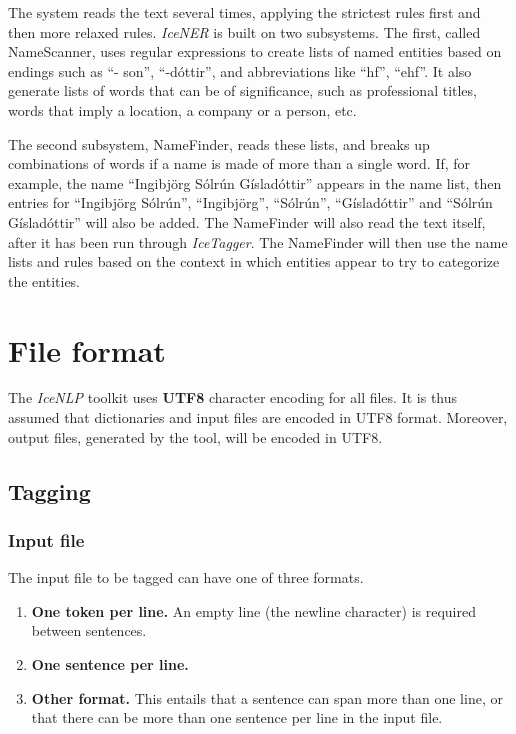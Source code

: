 \documentclass[11pt]{article}
\begin{document}
The system reads the text several times, applying the strictest rules first and then more relaxed rules.
\emph{IceNER} is built on two subsystems.
The first, called NameScanner, uses regular expressions to create lists of named entities based on endings such as ``-
son'', ``-dóttir'', and abbreviations like ``hf'', ``ehf''.
It also generate lists of words that can be of significance, such as professional titles, words that imply a location, a company or a person, etc.

The second subsystem, NameFinder, reads these lists, and breaks up combinations of words if a name is made of more than a single word. If, for example, the name ``Ingibjörg Sólrún Gísladóttir'' appears in the name list, then entries for ``Ingibjörg Sólrún'', ``Ingibjörg'', ``Sólrún'', ``Gísladóttir'' and ``Sólrún Gísladóttir'' will also be added.
The NameFinder will also read the text itself, after it has been run through \emph{IceTagger}. 
The NameFinder will then use the name lists and rules based on the context in which entities appear
to try to categorize the entities. 


\section{File format}
The \emph{IceNLP} toolkit uses \textbf{UTF8} character encoding for all files.
It is thus assumed that dictionaries and input files are encoded in UTF8 format.
Moreover, output files, generated by the tool, will be encoded in UTF8.

\subsection{Tagging}
\subsubsection{Input file}
The input file to be tagged can have one of three formats.
\begin{enumerate}
\item {\bf One token per line.} An empty line (the newline character) is required between sentences.
\item {\bf One sentence per line. }
\item {\bf Other format.} This entails that a sentence can span more than one line, or that there can be more than one sentence per line in the input file.
\end{enumerate}
\end{document}
